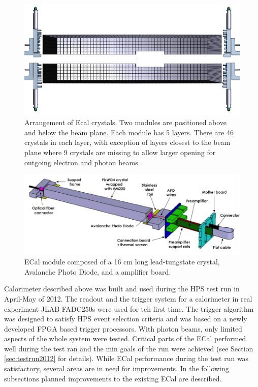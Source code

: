 \begin{figure}[t]
\includegraphics[width=\textwidth]{ecal/ECal.png}
\caption{\small{Arrangement of Ecal crystals. Two modules are positioned above and below the beam plane. Each module has 5 layers. There are 46 crystals in each layer, with exception of layers closest to the beam plane where 9 crystals are missing to allow larger opening for outgoing electron and photon beams.}}\label{fig:ecal}
\end{figure}

\begin{figure}[t]
\includegraphics[width=\textwidth]{ecal/ecal_module.png}
\caption{\small{ECal module composed of a 16 cm long lead-tungstate crystal, Avalanche Photo Diode, and a amplifier board.}}\label{fig:module}
\end{figure}

Calorimeter described above was built and used during the HPS test run in April-May of 2012. The readout and the trigger system for a calorimeter in real experiment JLAB FADC250s were used for teh first time. The trigger algorithm was designed to satisfy HPS event selection criteria and was based on a newly developed FPGA based trigger processors. With photon beams, only limited aspects of the whole system were tested. Critical parts of the ECal performed well during the test ran and the min goals of the run were achieved (see Section \ref{sec:testrun2012} for details). While ECal performance during the test run was satisfactory, several areas are in need for improvements. In the following subsections planned improvements to the existing ECal are described.   

